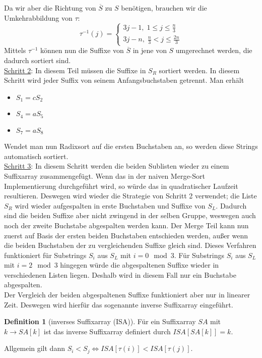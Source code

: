 \documentclass[a4paper, 12pt]{article}
\theoremstyle{plain}
\theoremstyle{definition}
\newtheorem{definition}[theorem]{Definition} %
\theoremstyle{lemma}
\theoremstyle{remark}
\theoremstyle{corollary}
\theoremstyle{example}
\begin{document}
	Da wir aber die Richtung von $\overline{S}$ zu $S$ benötigen, brauchen wir die Umkehrabbildung von $\tau$: \[\tau^{-1}(j) = \begin{cases}
		3j-1, \; 1 \leq j \leq \frac{n}{3}\\
		3j-n, \; \frac{n}{3} < j \leq \frac{2n}{3}
	\end{cases}\]
	Mittels $\tau^{-1}$ können nun die Suffixe von $\overline{S}$ in jene von $S$ umgerechnet werden, die dadurch sortiert sind.\\
	\underline{Schritt 2}: In diesem Teil müssen die Suffixe in $S_R$ sortiert werden. In diesem Schritt wird jeder Suffix von seinem Anfangsbuchstaben getrennt. Man erhält \begin{itemize}
		\item $S_1 = cS_2$
		\item $S_4 = aS_5$
		\item $S_7 = aS_8$
	\end{itemize}
	Wendet man nun Radixsort auf die ersten Buchstaben an, so werden diese Strings automatisch sortiert.\\
	\underline{Schritt 3}: In diesem Schritt werden die beiden Sublisten wieder zu einem Suffixarray zusammengefügt. Wenn das in der naiven Merge-Sort Implementierung durchgeführt wird, so würde das in quadratischer Laufzeit resultieren. Deswegen wird wieder die Strategie von Schritt 2 verwendet; die Liste $S_R$ wird wieder aufgespalten in erste Buchstaben und Suffixe von $S_L$. Dadurch sind die beiden Suffixe aber nicht zwingend in der selben Gruppe, weswegen auch noch der zweite Buchstabe abgespalten werden kann. Der Merge Teil kann nun zuerst auf Basis der ersten beiden Buchstaben entschieden werden, außer wenn die beiden Buchstaben der zu vergleichenden Suffixe gleich sind. Dieses Verfahren funktioniert für Substrings $S_i$ aus $S_L$ mit $i = 0 \mod 3$. Für Substrings $S_i$ aus $S_L$ mit $i = 2 \mod 3$ hingegen würde die abgespaltenen Suffixe wieder in verschiedenen Listen liegen. Deshalb wird in diesem Fall nur ein Buchstabe abgespalten.\\
	Der Vergleich der beiden abgespaltenen Suffixe funktioniert aber nur in linearer Zeit. Deswegen wird hierfür das sogenannte inverse Suffixarray eingeführt.
	\begin{definition}[inverses Suffixarray (ISA)]
		Für ein Suffixarray $SA$ mit $k \to SA[k]$ ist das inverse Suffixarray definiert durch $ISA[SA[k]] = k$.
	\end{definition}
	Allgemein gilt dann $S_i < S_j \Leftrightarrow ISA[\tau(i)] < ISA[\tau(j)]$.
\end{document}
